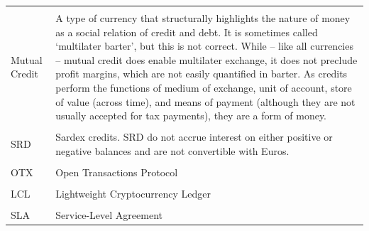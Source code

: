 {\begin{longtable}[]{@{}ll@{}}
\tabularnewline\tabularnewline
\begin{minipage}[t]{0.2\columnwidth}\raggedright\strut
Mutual Credit
\strut
\end{minipage} & \begin{minipage}[t]{0.77\columnwidth}\raggedright\strut
A type of currency that structurally highlights the nature of money as a social relation of credit and debt. It is sometimes called `multilater barter', but this is not correct. While -- like all currencies -- mutual credit does enable multilater exchange, it does not preclude profit margins, which are not easily quantified in barter. As credits perform the functions of medium of exchange, unit of account, store of value (across time), and means of payment (although they are not usually accepted for tax payments), they are a form of money.
\strut
\end{minipage}

\tabularnewline\tabularnewline
\begin{minipage}[t]{0.2\columnwidth}\raggedright\strut
SRD
\strut
\end{minipage} & \begin{minipage}[t]{0.77\columnwidth}\raggedright\strut
Sardex credits. SRD do not accrue interest on either positive or negative balances and are not convertible with Euros.
\strut
\end{minipage}

\tabularnewline\tabularnewline
\begin{minipage}[t]{0.2\columnwidth}\raggedright\strut
OTX
\strut
\end{minipage} & \begin{minipage}[t]{0.77\columnwidth}\raggedright\strut
Open Transactions Protocol
\strut
\end{minipage}

\tabularnewline\tabularnewline
\begin{minipage}[t]{0.2\columnwidth}\raggedright\strut
LCL
\strut
\end{minipage} & \begin{minipage}[t]{0.77\columnwidth}\raggedright\strut
Lightweight Cryptocurrency Ledger
\strut
\end{minipage}

\tabularnewline\tabularnewline
\begin{minipage}[t]{0.2\columnwidth}\raggedright\strut
SLA
\strut
\end{minipage} & \begin{minipage}[t]{0.77\columnwidth}\raggedright\strut
Service-Level Agreement
\strut
\end{minipage}

\tabularnewline
\bottomrule
\end{longtable}
}
